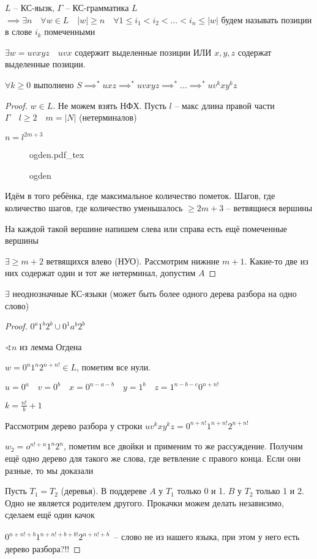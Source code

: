 \documentclass{book}
\newcommand{\p}[1]{#1^{\prime}}
\theoremstyle{definition}
\newcommand{\incfig}[1]{%
    \def\svgwidth{\columnwidth}
    {#1.pdf_tex}
}
\begin{document}
\begin{lemma}
    $L$ -- КС-яызк, $\Gamma$ -- КС-грамматика  $L$  $\implies \exists n\quad \forall w\in L\quad |w| \geqslant n\quad \forall 1 \leqslant i_1<i_2<\ldots<i_n\leqslant |w|$ будем называть позиции в слове $i_k$ помеченными

    $\exists w = uvxyz\quad uvx$ содержит выделенные позиции ИЛИ $x,y, z$ содержат выделенные позиции.

    $\forall k\geqslant 0$ выполнено $S \implies ^* uxz \implies ^*uvxyz \implies ^* \ldots \implies ^*  uv^kxy^kz$

\end{lemma}
\begin{proof}
    $w\in L$. Не можем взять НФХ. Пусть  $l$ -- макс длина правой части  $\Gamma\quad l\geqslant 2\quad m = |N|$ (нетерминалов)

    $n = l^{2m+3}$

\begin{figure}[!ht]
    \centering
    \incfig{ogden}
    \caption{ogden}
    \label{fig:ogden}
\end{figure}

Идём в того ребёнка, где максимальное количество пометок. Шагов, где количество шагов, где количество уменьшалось $\geqslant 2m+3$ -- ветвящиеся вершины

На каждой такой вершине напишем слева или справа есть ещё помеченные вершины

$\exists  \geqslant  m+2$ ветвящихся влево (НУО). Рассмотрим нижние $m+1$. Какие-то две из них содержат один и тот же нетерминал, допустим $A$
\end{proof}

\begin{statement}
    $\exists $ неоднозначные КС-языки (может быть более одного дерева разбора на одно слово)
\end{statement}
\begin{proof}
    $0^a 1^b 2^b \cup  0^1 a^b 2^b$

    $\sphericalangle n$ из лемма Огдена

    $w = 0^n 1^n 2^{n + n!} \in L$, пометим все нули.

    $u = 0^a\quad v = 0^b \quad x = 0^{n-a-b}\quad y = 1^b\quad z = 1^{n-b-c}0^{n + n!}$

     $k = \frac{n!}{b} + 1$ 

     Рассмотрим дерево разбора у строки $uv^kxy^kz = 0^{n + n!}1^{n + n!}2^{n + n!}$

     $w_2 = o^{n! + n}1^n 2^n$, пометим все двойки и применим то же рассуждение. Получим ещё одно дерево для такого же слова, где ветвление с правого конца. Если они разные, то мы доказали

     Пусть $T_1 = T_2$ (деревья). В поддереве $A$ у  $T_1$ только 0 и 1. $B$ у  $T_2$ только 1 и 2. Одно не является родителем другого. Прокачки можем делать независимо, сделаем ещё один качок

     $0^{n + n! + b}1^{n + n! + b + b!} 2^{n + n! + \p b}$ -- слово не из нашего языка, при этом у него есть дерево разбора?!!
\end{proof}
\end{document}
